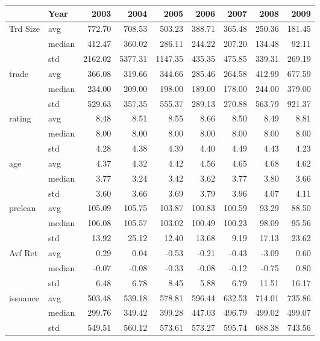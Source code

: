 \begin{tabular}{llrrrrrrr}
\toprule
 & Year & 2003 & 2004 & 2005 & 2006 & 2007 & 2008 & 2009 \\
\midrule
\multirow[t]{3}{*}{Trd Size} & avg & 772.70 & 708.53 & 503.23 & 388.71 & 365.48 & 250.36 & 181.45 \\
 & median & 412.47 & 360.02 & 286.11 & 244.22 & 207.20 & 134.48 & 92.11 \\
 & std & 2162.02 & 5377.31 & 1147.35 & 435.35 & 475.85 & 339.31 & 269.19 \\
\cline{1-9}
\multirow[t]{3}{*}{trade} & avg & 366.08 & 319.66 & 344.66 & 285.46 & 264.58 & 412.99 & 677.59 \\
 & median & 234.00 & 209.00 & 198.00 & 189.00 & 178.00 & 244.00 & 379.00 \\
 & std & 529.63 & 357.35 & 555.37 & 289.13 & 270.88 & 563.79 & 921.37 \\
\cline{1-9}
\multirow[t]{3}{*}{rating} & avg & 8.48 & 8.51 & 8.55 & 8.66 & 8.50 & 8.49 & 8.81 \\
 & median & 8.00 & 8.00 & 8.00 & 8.00 & 8.00 & 8.00 & 8.00 \\
 & std & 4.28 & 4.38 & 4.39 & 4.40 & 4.49 & 4.43 & 4.23 \\
\cline{1-9}
\multirow[t]{3}{*}{age} & avg & 4.37 & 4.32 & 4.42 & 4.56 & 4.65 & 4.68 & 4.62 \\
 & median & 3.77 & 3.24 & 3.42 & 3.62 & 3.77 & 3.80 & 3.66 \\
 & std & 3.60 & 3.66 & 3.69 & 3.79 & 3.96 & 4.07 & 4.11 \\
\cline{1-9}
\multirow[t]{3}{*}{prclean} & avg & 105.09 & 105.75 & 103.87 & 100.83 & 100.59 & 93.29 & 88.50 \\
 & median & 106.08 & 105.57 & 103.02 & 100.49 & 100.23 & 98.09 & 95.56 \\
 & std & 13.92 & 25.12 & 12.40 & 13.68 & 9.19 & 17.13 & 23.62 \\
\cline{1-9}
\multirow[t]{3}{*}{Avf Ret} & avg & 0.29 & 0.04 & -0.53 & -0.21 & -0.43 & -3.09 & 0.60 \\
 & median & -0.07 & -0.08 & -0.33 & -0.08 & -0.12 & -0.75 & 0.80 \\
 & std & 6.48 & 6.78 & 8.45 & 5.88 & 6.79 & 11.51 & 16.17 \\
\cline{1-9}
\multirow[t]{3}{*}{issuance} & avg & 503.48 & 539.18 & 578.81 & 596.44 & 632.53 & 714.01 & 735.86 \\
 & median & 299.76 & 349.42 & 399.28 & 447.03 & 496.79 & 499.02 & 499.07 \\
 & std & 549.51 & 560.12 & 573.61 & 573.27 & 595.74 & 688.38 & 743.56 \\

\end{tabular}
